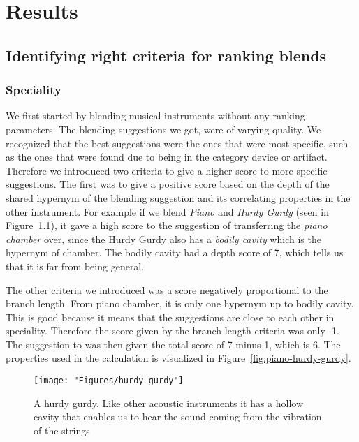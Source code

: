 
\chapter{Results} %

\label{Chapter6} %


\section{Identifying right criteria for ranking blends}

\subsection{Speciality}
We first started by blending musical instruments without any ranking parameters. The blending suggestions we got, were of varying quality. We recognized that the best suggestions were the ones that were most specific, such as the ones that were found due to being in the category device or artifact. Therefore we introduced two criteria to give a higher score to more specific suggestions. The first was to give a positive score based on the depth of the shared hypernym of the blending suggestion and its correlating properties in the other instrument. For example if we blend \emph{Piano} and \emph{Hurdy Gurdy} (seen in Figure~\ref{fig:hurdy-gurdy}), it gave a high score to the suggestion of transferring the \emph{piano chamber} over, since the Hurdy Gurdy also has a \emph{bodily cavity} which is the hypernym of chamber. The bodily cavity had a depth score of 7, which tells us that it is far from being general.

The other criteria we introduced was a score negatively proportional to the branch length. From piano chamber, it is only one hypernym up to bodily cavity. This is good because it means that the suggestions are close to each other in speciality. Therefore the score given by the branch length criteria was only -1. The suggestion to was then given the total score of 7 minus 1, which is 6. The properties used in the calculation is visualized in Figure~\ref{fig:piano-hurdy-gurdy}.

\begin{figure}
\centering
\texttt{[image: "Figures/hurdy gurdy"]}
\caption{A hurdy gurdy. Like other acoustic instruments it has a hollow cavity that enables us to hear the sound coming from the vibration of the strings}
\label{fig:hurdy-gurdy}
\end{figure}

